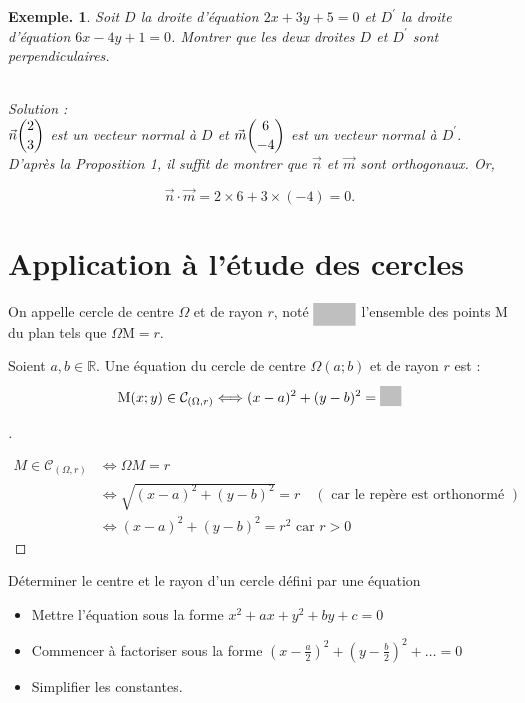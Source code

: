 \documentclass[12pt]{article}
\theoremstyle{break}
\newtheorem*{example}{Exemple.}
\newenvironment{demo}[1][\proofname]{%
  \begin{proof}[#1]$ $\newline
  }{%
  \end{proof}
}
\begin{document}
\begin{example}
  Soit $D$ la droite d'équation $2 x+3 y+5=0$ et $D^{\prime}$ la droite d'équation $6 x-4 y+1=0$. Montrer que les deux droites $D$ et $D^{\prime}$ sont perpendiculaires.

  ~\\Solution :\\
  $\vec{n}\dbinom{2}{3}$ est un vecteur normal à $D$ et $\vec{m}\dbinom{6}{-4}$ est un vecteur normal à $D^{\prime}$.\\
  D'après la Proposition 1, il suffit de montrer que $\vec{n}$ et $\vec{m}$ sont orthogonaux. Or,

  $$
  \vec{n} \cdot \vec{m}=2 \times 6+3 \times(-4)=0 .
  $$
\end{example}

\section{Application à l'étude des cercles}
\begin{definition}{}{}
  On appelle cercle de centre $\Omega$ et de rayon $r$, noté $\hideM{\mathcal{C}_{(\Omega, r)}}$ l'ensemble des points M du plan tels que $\Omega \mathrm{M}=r$.
\end{definition}

\begin{proposition}{}{}
  Soient $a, b \in \mathbb{R}$. Une équation du cercle de centre $\Omega(a ; b)$ et de rayon $r$ est :

  $$
  \mathrm{M}(x ; y) \in \mathcal{C}_{(\Omega, r)} \Longleftrightarrow(x-a)^{2}+(y-b)^{2}=\hideM{r^{2}}
  $$
\end{proposition}

\begin{demo}

  $$
  \begin{aligned}
    M \in \mathcal{C}_{(\Omega, r)} & \Longleftrightarrow \Omega M=r \\
    & \Longleftrightarrow \sqrt{(x-a)^{2}+(y-b)^{2}}=r \quad(\text { car le repère est orthonormé }) \\
    & \Longleftrightarrow(x-a)^{2}+(y-b)^{2}=r^{2} \text { car } r>0
  \end{aligned}
  $$
\end{demo}

\begin{method}{Déterminer le centre et le rayon d'un cercle défini par une équation}{}
  \begin{itemize}
    \item Mettre l'équation sous la forme $x^{2}+a x+y^{2}+b y+c=0$
    \item Commencer à factoriser sous la forme $\left(x-\frac{a}{2}\right)^{2}+\left(y-\frac{b}{2}\right)^{2}+\ldots=0$
    \item Simplifier les constantes.
  \end{itemize}
\end{method}
\end{document}
